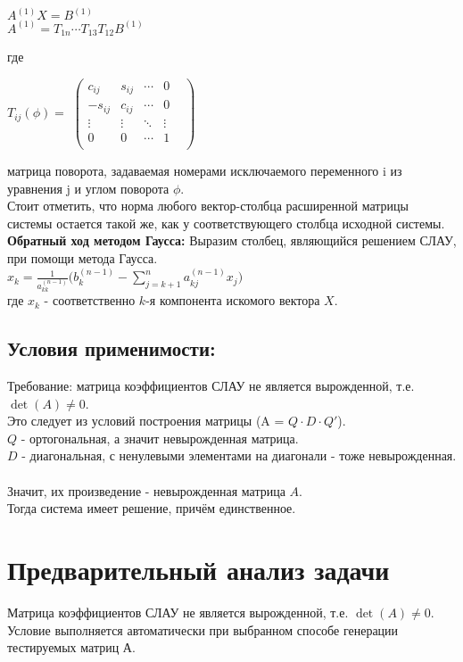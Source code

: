 \documentclass[12pt]{article}
\begin{document}
\begin{center}
    $A^{(1)}X = B^{(1)}$\\
    $A^{(1)} = T_{1n}\cdots T_{13} T_{12} B^{(1)}$
\end{center}
где 
\begin{center}
$T_{ij}(\phi) =$
$\begin{pmatrix}
c_{ij}& s_{ij}& \cdots& 0& \\
-s_{ij}& c_{ij}& \cdots& 0&\\
\vdots& \vdots& \ddots& \vdots& \\
0& 0& \cdots& 1& \\
\end{pmatrix}$
\end{center}
матрица поворота, задаваемая номерами исключаемого переменного i из уравнения j  и углом поворота $\phi$.\\
Стоит отметить, что норма любого вектор-столбца расширенной матрицы системы остается такой же, как у соответствующего столбца исходной системы.\\
\textbf{Обратный ход методом Гаусса:}
Выразим столбец, являющийся решением СЛАУ, при помощи метода Гаусса.\\
$x_{k} = \frac{1}{a_{kk}^{(n-1)}}\bigg(b_{k}^{(n-1)}- \sum\limits_{j=k+1}^na_{kj}^{(n-1)}x_{j}\bigg)$\\ 
где $x_{k}$ - соответственно $k$-я компонента искомого вектора $X$. 
\subsection{Условия применимости:}
Требование: матрица коэффициентов СЛАУ не является вырожденной, т.е. $\det(A) \neq 0$.\\
Это следует из условий построения матрицы (A = $Q \cdot D \cdot Q'$).\\
$Q$ - ортогональная, а значит невырожденная матрица.\\
$D$ - диагональная, с ненулевыми элементами на диагонали - тоже невырожденная. \\
\\Значит, их произведение - невырожденная матрица $A$.\\
Тогда система имеет решение, причём единственное.
\section{Предварительный анализ задачи}
Матрица коэффициентов СЛАУ не является вырожденной, т.е. $\det(A) \neq 0$.\\
Условие выполняется автоматически при выбранном способе  генерации тестируемых матриц А.
\end{document}
